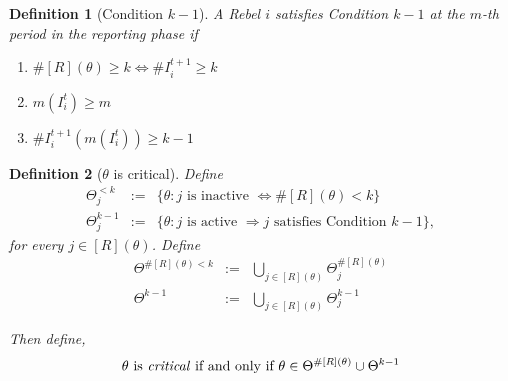 \documentclass[12pt,letter]{article}
\newcommand{\Omicron}{\mathbb{R}}
\newtheorem{definition}{Definition}[section]
\theoremstyle{definition}
\theoremstyle{remark}
\theoremstyle{claim}
\begin{document}

\begin{definition}[Condition $k-1$]
A Rebel $i$ satisfies Condition $k-1$ at the $m$-th period in the reporting phase if
\begin{enumerate}
\item $\#[R](\theta)\geq k\Leftrightarrow\#I^{t+1}_i\geq k$
\item $m(I^t_i)\geq m$
\item $\#I^{t+1}_i(m(I^t_i))\geq k-1$
\end{enumerate}
\end{definition}



\begin{definition}[$\theta$ is critical]
Define
\begin{eqnarray*}
\Theta^{<k}_j & := & \{\theta:\text{$j$ is inactive }\Leftrightarrow\#[R](\theta)<k\} \\
\Theta^{k-1}_j & := & \{\theta:\text{$j$ is active }\Rightarrow \text{$j$ satisfies Condition $k-1$}\},
\end{eqnarray*}
for every $j\in [R](\theta)$. Define
\begin{eqnarray*}
\Theta^{\#[R](\theta)<k} & :=  &\bigcup_{j\in [R](\theta)}\Theta^{\#[R](\theta)}_j\\
\Theta^{k-1} & :=  &\bigcup_{j\in [R](\theta)}\Theta^{k-1}_j
\end{eqnarray*}

Then define, \[\text{$\theta$ is \textit{critical} if and only if $\theta\in \Theta^{\#[R](\theta)}\cup \Theta^{k-1}$}\]
\end{definition}






\end{document}
